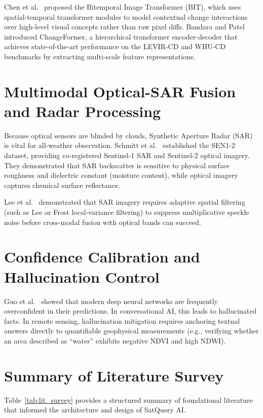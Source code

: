 \documentclass[12pt,a4paper]{report}
\begin{document}
Chen et al.~\cite{bit} proposed the Bitemporal Image Transformer (BIT), which uses spatial-temporal transformer modules to model contextual change interactions over high-level visual concepts rather than raw pixel diffs. Bandara and Patel~\cite{changeformer} introduced ChangeFormer, a hierarchical transformer encoder-decoder that achieves state-of-the-art performance on the LEVIR-CD and WHU-CD benchmarks by extracting multi-scale feature representations.

\section{Multimodal Optical-SAR Fusion and Radar Processing}
Because optical sensors are blinded by clouds, Synthetic Aperture Radar (SAR) is vital for all-weather observation. Schmitt et al.~\cite{sen12} established the SEN1-2 dataset, providing co-registered Sentinel-1 SAR and Sentinel-2 optical imagery. They demonstrated that SAR backscatter is sensitive to physical surface roughness and dielectric constant (moisture content), while optical imagery captures chemical surface reflectance.

Lee et al.~\cite{sar_despeckle} demonstrated that SAR imagery requires adaptive spatial filtering (such as Lee or Frost local-variance filtering) to suppress multiplicative speckle noise before cross-modal fusion with optical bands can succeed.

\section{Confidence Calibration and Hallucination Control}
Guo et al.~\cite{calibration} showed that modern deep neural networks are frequently overconfident in their predictions. In conversational AI, this leads to hallucinated facts. In remote sensing, hallucination mitigation requires anchoring textual answers directly to quantifiable geophysical measurements (e.g., verifying whether an area described as ``water'' exhibits negative NDVI and high NDWI).

\section{Summary of Literature Survey}
Table~\ref{tab:lit_survey} provides a structured summary of foundational literature that informed the architecture and design of SatQuery AI.
\end{document}
